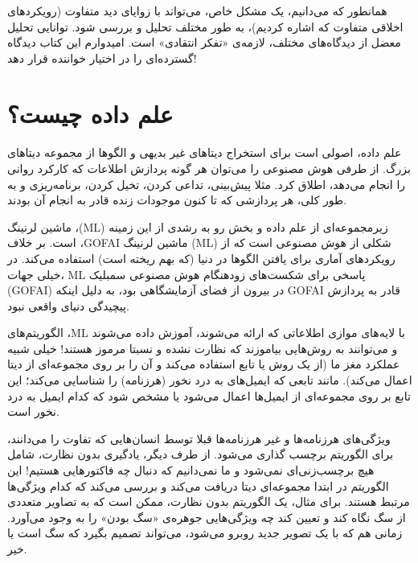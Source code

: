 \documentclass[10pt,oneside]{book}
\begin{document}
    همانطور که می‌دانیم، یک مشکل خاص، می‌تواند با زوایای دید متفاوت (رویکردهای اخلاقی متفاوت که اشاره کردیم)، به طور مختلف تحلیل و بررسی شود.
    توانایی تحلیل معضل از دیدگاه‌های مختلف، لازمه‌ی «تفکر انتقادی» است.
    امیدوارم این کتاب دیدگاه گسترده‌ای را در اختیار خواننده قرار دهد!

    \newpage

    \section{علم داده چیست؟}
    \paragraph{}
    علم داده، اصولی است برای استخراج دیتاهای غیر بدیهی و الگوها از مجموعه دیتاهای بزرگ.
    از طرفی هوش مصنوعی را می‌توان هر گونه پردازش اطلاعات که کارکرد روانی را انجام می‌دهد، اطلاق کرد.
    مثلا پیش‌بینی، تداعی کردن، تخیل کردن، برنامه‌ریزی و به طور کلی، هر پردازشی که تا کنون موجودات زنده قادر به انجام آن بودند.

    ماشین لرنینگ ،(ML) زیرمجموعه‌ای از علم داده و بخش رو به رشدی از این زمینه است.
    بر خلاف ،GOFAI ماشین لرنینگ (ML) شکلی از هوش مصنوعی است که از رویکردهای آماری برای یافتن الگوها در دنیا (که بهم ریخته است) استفاده می‌کند.
    در خیلی جهات، ML پاسخی برای شکست‌های زودهنگام هوش مصنوعی سمبلیک (GOFAI) در بیرون از فضای آزمایشگاهی بود، به دلیل اینکه GOFAI قادر به پردازش پیچیدگی دنیای واقعی نبود.

    الگوریتم‌های ،ML با لایه‌های موازی اطلاعاتی که ارائه می‌شوند، آموزش داده می‌شوند و می‌توانند به روش‌هایی بیاموزند که نظارت نشده و نسبتا مرموز هستند!
    خیلی شبیه عملکرد مغز ما (از یک روش یا تابع استفاده می‌کند و آن را بر روی مجموعه‌ای از دیتا اعمال می‌کند).
    مانند تابعی که ایمیل‌های به درد نخور (هرزنامه) را شناسایی می‌کند؛ این تابع بر روی مجموعه‌ای از ایمیل‌ها اعمال می‌شود یا مشخص شود که کدام ایمیل به درد نخور است.

    ویژگی‌های هرزنامه‌ها و غیر هرزنامه‌ها قبلا توسط انسان‌هایی که تفاوت را می‌دانند، برای الگوریتم برچسب گذاری می‌شود.
    از طرف دیگر، یادگیری بدون نظارت، شامل هیچ برچسب‌زنی‌ای نمی‌شود و ما نمی‌دانیم که دنبال چه فاکتورهایی هستیم!
    این الگوریتم در ابتدا مجموعه‌ای دیتا دریافت می‌کند و بررسی می‌کند که کدام ویژگی‌ها مرتبط هستند.
    برای مثال، یک الگوریتم بدون نظارت، ممکن است که به تصاویر متعددی از سگ نگاه کند و تعیین کند چه ویژگی‌هایی جوهره‌ی «سگ بودن» را به وجود می‌آورد.
    زمانی هم که با یک تصویر جدید روبرو می‌شود، می‌تواند تصمیم بگیرد که سگ است یا خیر.
\end{document}
